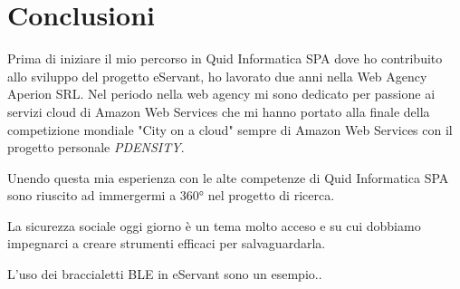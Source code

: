 \chapter{Conclusioni}

Prima di iniziare il mio percorso in Quid Informatica SPA dove ho contribuito allo
sviluppo del progetto eServant, ho lavorato due anni nella Web Agency Aperion SRL.
Nel periodo nella web agency mi sono dedicato per passione ai servizi cloud di Amazon
Web Services che mi hanno portato alla finale della competizione mondiale "City on a
cloud" sempre di Amazon Web Services con il progetto personale \textit{PDENSITY}.

Unendo questa mia esperienza con le alte competenze di Quid Informatica SPA sono 
riuscito ad immergermi a 360° nel progetto di ricerca.

La sicurezza sociale oggi giorno è un tema molto acceso e su cui dobbiamo
impegnarci a creare strumenti efficaci per salvaguardarla.

L'uso dei braccialetti BLE in eServant sono un esempio..